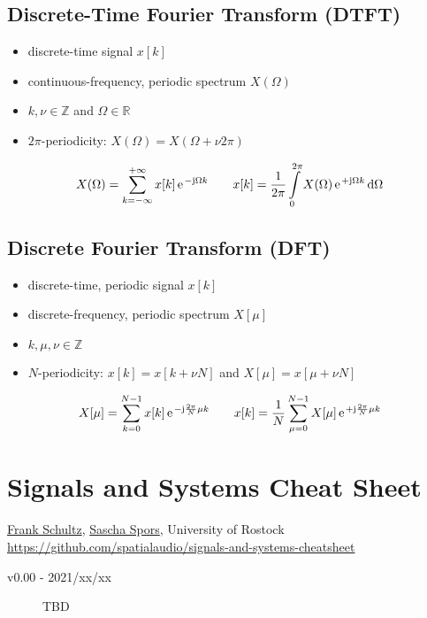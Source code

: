 \documentclass[landscape,columns=2]{cheatsheet} %
\begin{document}
\subsection{Discrete-Time Fourier Transform (DTFT)}
%
\begin{itemize}
\setlength\itemsep{-0.5em}
\item discrete-time signal $x[k]$
%
\item continuous-frequency, periodic spectrum $X(\Omega)$
%
\item $k,\nu\in\mathbb{Z}$ and $\Omega\in\mathbb{R}$
%
\item  $2\pi$-periodicity: $X(\Omega)=X(\Omega+\nu2\pi)$
\end{itemize}
%
\begin{align*}
X(\Omega) = \sum\limits_{k=-\infty}^{+\infty} x[k] \,\e^{-\im \Omega k}
\qquad
x[k] = \frac{1}{2\pi}\int\limits_{0}^{2\pi} X(\Omega) \,\e^{+\im \Omega k}\,\mathrm{d}\Omega
\end{align*}







\subsection{Discrete Fourier Transform (DFT)}
%
\begin{itemize}
\setlength\itemsep{-0.5em}
\item discrete-time, periodic signal $x[k]$
%
\item discrete-frequency, periodic spectrum $X[\mu]$
%
\item $k,\mu,\nu\in\mathbb{Z}$
%
\item  $N$-periodicity: $x[k]=x[k + \nu N]$ and $X[\mu]=x[\mu + \nu N]$
\end{itemize}
%
\begin{align*}
X[\mu] = \sum\limits_{k=0}^{N-1} x[k] \,\e^{-\im \frac{2\pi}{N} \mu k}
\qquad
x[k] = \frac{1}{N}\sum\limits_{\mu=0}^{N-1} X[\mu] \,\e^{+\im \frac{2\pi}{N} \mu k}
\end{align*}

\section{Signals and Systems Cheat Sheet}
\href{https://orcid.org/0000-0002-3010-0294}{Frank Schultz},
\href{https://orcid.org/0000-0001-7225-9992}{Sascha Spors},
University of Rostock\\
\tiny
\url{https://github.com/spatialaudio/signals-and-systems-cheatsheet}
\normalsize
\begin{description}
\item[v0.00 - 2021/xx/xx] TBD
\end{description}
\end{document}
